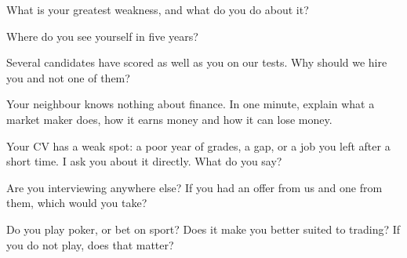 \begin{question}\label{iq:iv2:behavioural-and-fit:6}
What is your greatest weakness, and what do you do about it?
\end{question}

\begin{question}\label{iq:iv2:behavioural-and-fit:7}
Where do you see yourself in five years?
\end{question}

\begin{question}\label{iq:iv2:behavioural-and-fit:8}
Several candidates have scored as well as you on our tests. Why should we hire you and not one of them?
\end{question}

\begin{question}\label{iq:iv2:behavioural-and-fit:9}
Your neighbour knows nothing about finance. In one minute, explain what a market maker does, how it earns money and how it can lose money.
\end{question}

\begin{question}\label{iq:iv2:behavioural-and-fit:10}
Your CV has a weak spot: a poor year of grades, a gap, or a job you left after a short time. I ask you about it directly. What do you say?
\end{question}

\begin{question}\label{iq:iv2:behavioural-and-fit:11}
Are you interviewing anywhere else? If you had an offer from us and one from them, which would you take?
\end{question}

\begin{question}\label{iq:iv2:behavioural-and-fit:12}
Do you play poker, or bet on sport? Does it make you better suited to trading? If you do not play, does that matter?
\end{question}

